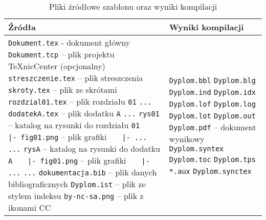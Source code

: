 \begin{table}[htb]
\centering\small
\caption{Pliki źródłowe szablonu oraz wyniki kompilacji}
\label{tab:szablon}
\begin{tabularx}{\linewidth}{|p{.55\linewidth}|X|}\hline
Źródła & Wyniki kompilacji \\ \hline\hline
\verb?Dokument.tex? - dokument główny\newline
\verb?Dokument.tcp? -- plik projektu TeXnicCenter (opcjonalny)\newline
\verb?streszczenie.tex? -- plik streszczenia\newline
\verb?skroty.tex? -- plik ze skrótami\newline
\verb?rozdzial01.tex? -- plik rozdziału \texttt{01}\newline
\verb?...?\newline
\verb?dodatekA.tex? -- plik dodatku \texttt{A}\newline
\verb?...?\newline
\verb?rys01? -- katalog na rysunki do rozdziału \texttt{01}\newline
\verb?   |- fig01.png? -- plik grafiki\newline
\verb?   |- ...?\newline
\verb?...?\newline
\verb?rysA? -- katalog na rysunki do dodatku \texttt{A}\newline
\verb?   |- fig01.png? -- plik grafiki\newline
\verb?   |- ...?\newline
\verb?...?\newline
\verb?dokumentacja.bib? -- plik danych bibliograficznych\newline
\verb?Dyplom.ist? -- plik ze stylem indeksu\newline
\verb?by-nc-sa.png? -- plik z ikonami CC\newline
 &
\verb?Dyplom.bbl?\newline
\verb?Dyplom.blg?\newline
\verb?Dyplom.ind?\newline
\verb?Dyplom.idx?\newline
\verb?Dyplom.lof?\newline
\verb?Dyplom.log?\newline
\verb?Dyplom.lot?\newline
\verb?Dyplom.out?\newline
\verb?Dyplom.pdf? -- dokument wynikowy\newline
\verb?Dyplom.syntex?\newline
\verb?Dyplom.toc?\newline
\verb?Dyplom.tps?\newline
\verb?*.aux?\newline 
\verb?Dyplom.synctex?\newline\\
\hline
\end{tabularx}
\end{table}

